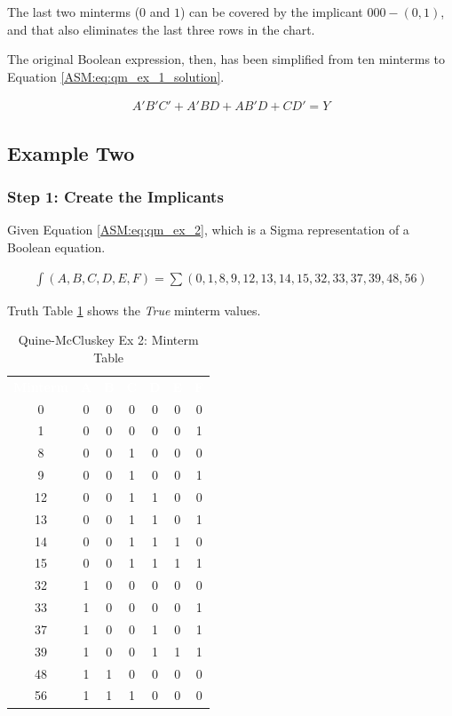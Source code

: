 The last two minterms ($ 0 $ and $ 1 $) can be covered by the implicant $ 000- (0,1) $, and that also eliminates the last three rows in the chart. 

The original Boolean expression, then, has been simplified from ten minterms to Equation \ref{ASM:eq:qm_ex_1_solution}.

\begin{align}
	\label{ASM:eq:qm_ex_1_solution}
	A'B'C'+A'BD+AB'D+CD' = Y 
\end{align}

\subsection{Example Two}
\label{ASM:subsec:quine-mccluskey_ex_2}

\subsubsection{Step 1: Create the Implicants}
\label{ASM:subsubsec:quine-mccluskey_ex_2_step_1}

Given Equation \ref{ASM:eq:qm_ex_2}, which is a Sigma representation of a Boolean equation.

\begin{align}
\label{ASM:eq:qm_ex_2}
\int(A,B,C,D,E,F)=\sum(0,1,8,9,12,13,14,15,32,33,37,39,48,56) 
\end{align}

Truth Table \ref{ASM:tab:qm_ex_2_minterm_table} shows the \emph{True} minterm values.

\begin{table}[H]
	\sffamily
	\newcommand{\head}[1]{\textcolor{white}{\textbf{#1}}}		
	\begin{center}
		\begin{tabular}{ccccccc} 
			\rowcolor{black!75}
			\head{Minterm} & \head{A} & \head{B} & \head{C} 
				& \head{D} & \head{E} & \head{F} \\
			0  & 0 & 0 & 0 & 0 & 0 & 0 \\
			1  & 0 & 0 & 0 & 0 & 0 & 1 \\
			8  & 0 & 0 & 1 & 0 & 0 & 0 \\
			9  & 0 & 0 & 1 & 0 & 0 & 1 \\
			12 & 0 & 0 & 1 & 1 & 0 & 0 \\
			13 & 0 & 0 & 1 & 1 & 0 & 1 \\
			14 & 0 & 0 & 1 & 1 & 1 & 0 \\
			15 & 0 & 0 & 1 & 1 & 1 & 1 \\
			32 & 1 & 0 & 0 & 0 & 0 & 0 \\
			33 & 1 & 0 & 0 & 0 & 0 & 1 \\
			37 & 1 & 0 & 0 & 1 & 0 & 1 \\
			39 & 1 & 0 & 0 & 1 & 1 & 1 \\
			48 & 1 & 1 & 0 & 0 & 0 & 0 \\
			56 & 1 & 1 & 1 & 0 & 0 & 0 \\
		\end{tabular}
	\end{center}
	\caption{Quine-McCluskey Ex 2: Minterm Table}
  \label{ASM:tab:qm_ex_2_minterm_table}
\end{table}

